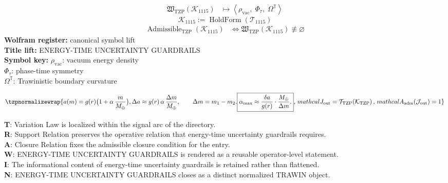 \noindent
\begin{minipage}[t]{0.48\linewidth}
\begingroup
\small
\[
\begin{aligned}
\mathfrak{W}_{\mathrm{TZP}}\!\left(\mathcal{K}_{1115}\right)
&\longmapsto
\left\langle \rho_{\mathrm{vac}},\; \Phi_{\tau},\; \Omega^{\mathbb{T}} \right\rangle
\end{aligned}
\]
\[
\mathcal{K}_{1115}
:=
\operatorname{HoldForm}\!\left(\mathcal{T}_{1115}\right)
\]
\[
\begin{aligned}
\operatorname{Admissible}_{\mathrm{TZP}}\!\left(\mathcal{K}_{1115}\right)
&\Longleftrightarrow
\mathfrak{W}_{\mathrm{TZP}}\!\left(\mathcal{K}_{1115}\right)\not\equiv\varnothing
\end{aligned}
\]
\textbf{Wolfram register:} canonical symbol lift\\
\textbf{Title lift:} ENERGY-TIME UNCERTAINTY GUARDRAILS\\
\textbf{Symbol key:} \(\rho_{\mathrm{vac}}\): vacuum energy density\\ \(\Phi_{\tau}\): phase-time symmetry\\ \(\Omega^{\mathbb{T}}\): Trawinistic boundary curvature
\par
\endgroup
\end{minipage}\hfill
\begin{minipage}[t]{0.48\linewidth}
\[
\tzpnormalizewrap{a(m)=g(r)\big(1+\alpha\,\frac{m}{M_\oplus}\big), \Delta a \approx g(r)\,\alpha\,\frac{\Delta m}{M_\oplus},\qquad \Delta m=m_1-m_2. \boxed{\alpha_{\max}\approx\frac{\delta a}{g(r)}\cdot\frac{M_\oplus}{\Delta m}.},\,mathcal{J}_{\mathrm{out}} = \mathcal{T}_{\mathrm{TZP}}\!\left(\mathcal{K}_{\mathrm{TZP}}\right),\,mathcal{A}_{\mathrm{adm}}\!\left(\mathcal{J}_{\mathrm{out}}\right)=1}
\]

\small
\textbf{T}: Variation Law is localized within the signal arc of the directory.\\
\textbf{R}: Support Relation preserves the operative relation that energy-time uncertainty guardrails requires.\\
\textbf{A}: Closure Relation fixes the admissible closure condition for the entry.\\
\textbf{W}: ENERGY-TIME UNCERTAINTY GUARDRAILS is rendered as a reusable operator-level statement.\\
\textbf{I}: The informational content of energy-time uncertainty guardrails is retained rather than flattened.\\
\textbf{N}: ENERGY-TIME UNCERTAINTY GUARDRAILS closes as a distinct normalized TRAWIN object.
\normalsize
\end{minipage}

